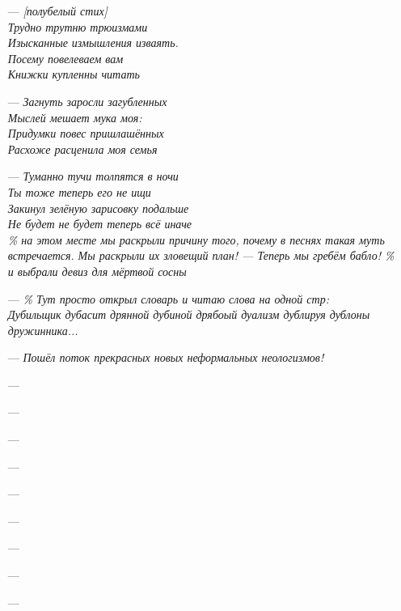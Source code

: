 \begin{itemize}
{                  Говоришь гундёж гремучий\\
                  Ты теперь тут получай}
  \item[---] \emph{[полубелый стих]\\
  Трудно трутню трюизмами\\
Изысканные измышления изваять.\\
Посему повелеваем вам\\
Книжки купленны читать}
  \item[---] \emph{Загнуть заросли загубленных\\
Мыслей мешает мука моя:\\
Придумки повес пришлашённых\\
Расхоже расценила моя семья}
  \item[---] \emph{Туманно тучи толпятся в ночи\\
Ты тоже теперь его не ищи\\
Закинул зелёную зарисовку подальше\\
Не будет не будет теперь всё иначе}\\
\emph{\% на этом месте мы раскрыли причину того, почему в песнях такая муть встречается.}
\emph{Мы раскрыли их зловещий план! --- Теперь мы гребём бабло! \% и выбрали девиз для мёртвой сосны}
  \item[---] \emph{\% Тут  просто открыл словарь и читаю слова на одной стр:\\
Дубильщик дубасит дрянной дубиной дрябоый дуализм дублируя дублоны дружинника...}
  \item[---] \emph{Пошёл поток прекрасных новых неформальных неологизмов!}
  \item[---] \emph{}
  \item[---] \emph{}
  \item[---] \emph{}
  \item[---] \emph{}
  \item[---] \emph{}
  \item[---] \emph{}
  \item[---] \emph{}
  \item[---] \emph{}
  \item[---] \emph{}
\end{itemize}

